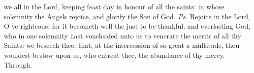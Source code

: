 \introit
{} we all in the Lord, keeping feast day in honour of all the saints: in whose solemnity the Angels rejoice, and glorify the Son of God. \textit{Ps.} Rejoice in the Lord, O ye righteous: for it becometh well the just to be thankful.
\collect
 and everlasting God, who in one solemnity hast vouchsafed unto us to venerate the merits of all thy Saints: we beseech thee; that, at the intercession of so great a multitude, thou wouldest bestow upon us, who entreat thee, the abundance of thy mercy. Through.

